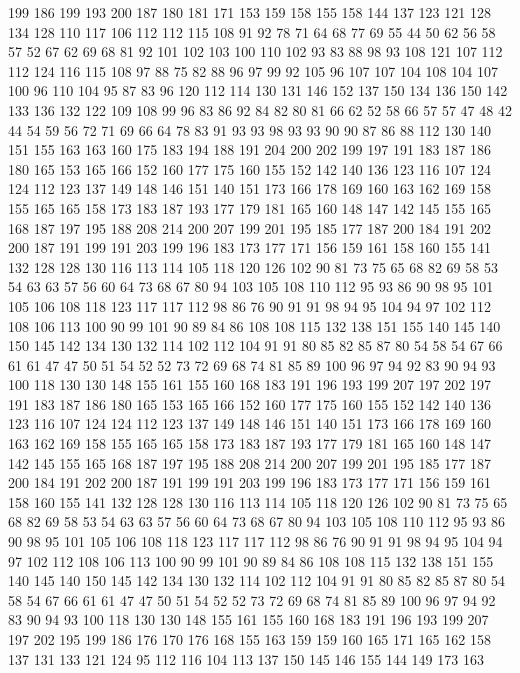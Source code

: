 199 186 199 193 200 187 180 181 171 153 159 158 155 158 144 137 123 121 128 134
128 110 117 106 112 112 115 108 91 92 78 71 64 68 77 69 55 44 50 62
56 58 57 52 67 62 69 68 81 92 101 102 103 100 110 102 93 83 88 98
93 108 121 107 112 112 124 116 115 108 97 88 75 82 88 96 97 99 92 105
96 107 107 104 108 104 107 100 96 110 104 95 87 83 96 120 112 114 130 131
146 152 137 150 134 136 150 142 133 136 132 122 109 108 99 96 83 86 92 84
82 80 81 66 62 52 58 66 57 57 47 48 42 44 54 59 56 72 71 69
66 64 78 83 91 93 93 98 93 93 90 90 87 86 88 112 130 140 151 155
163 163 160 175 183 194 188 191 204 200 202 199 197 191 183 187 186 180 165 153
165 166 152 160 177 175 160 155 152 142 140 136 123 116 107 124 124 112 123 137
149 148 146 151 140 151 173 166 178 169 160 163 162 169 158 155 165 165 158 173
183 187 193 177 179 181 165 160 148 147 142 145 155 165 168 187 197 195 188 208
214 200 207 199 201 195 185 177 187 200 184 191 202 200 187 191 199 191 203 199
196 183 173 177 171 156 159 161 158 160 155 141 132 128 128 130 116 113 114 105
118 120 126 102 90 81 73 75 65 68 82 69 58 53 54 63 63 57 56 60
64 73 68 67 80 94 103 105 108 110 112 95 93 86 90 98 95 101 105 106
108 118 123 117 117 112 98 86 76 90 91 91 98 94 95 104 94 97 102 112
108 106 113 100 90 99 101 90 89 84 86 108 108 115 132 138 151 155 140 145
140 150 145 142 134 130 132 114 102 112 104 91 91 80 85 82 85 87 80 54
58 54 67 66 61 61 47 47 50 51 54 52 52 73 72 69 68 74 81 85
89 100 96 97 94 92 83 90 94 93 100 118 130 130 148 155 161 155 160 168
183 191 196 193 199 207 197 202 197 191 183 187 186 180 165 153 165 166 152 160
177 175 160 155 152 142 140 136 123 116 107 124 124 112 123 137 149 148 146 151
140 151 173 166 178 169 160 163 162 169 158 155 165 165 158 173 183 187 193 177
179 181 165 160 148 147 142 145 155 165 168 187 197 195 188 208 214 200 207 199
201 195 185 177 187 200 184 191 202 200 187 191 199 191 203 199 196 183 173 177
171 156 159 161 158 160 155 141 132 128 128 130 116 113 114 105 118 120 126 102
90 81 73 75 65 68 82 69 58 53 54 63 63 57 56 60 64 73 68 67
80 94 103 105 108 110 112 95 93 86 90 98 95 101 105 106 108 118 123 117
117 112 98 86 76 90 91 91 98 94 95 104 94 97 102 112 108 106 113 100
90 99 101 90 89 84 86 108 108 115 132 138 151 155 140 145 140 150 145 142
134 130 132 114 102 112 104 91 91 80 85 82 85 87 80 54 58 54 67 66
61 61 47 47 50 51 54 52 52 73 72 69 68 74 81 85 89 100 96 97
94 92 83 90 94 93 100 118 130 130 148 155 161 155 160 168 183 191 196 193
199 207 197 202 195 199 186 176 170 176 168 155 163 159 159 160 165 171 165 162
158 137 131 133 121 124 95 112 116 104 113 137 150 145 146 155 144 149 173 163
